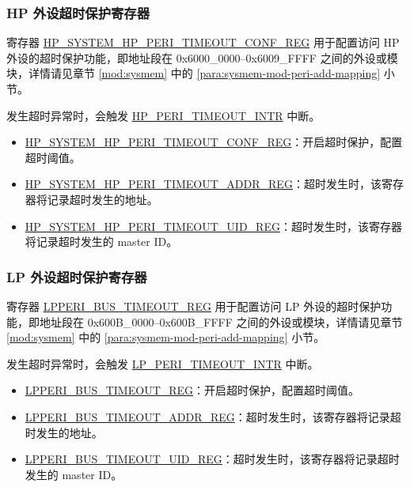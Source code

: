 \documentclass[main\_\_CN.tex]{subfiles}
\begin{document}
\subsubsection{HP 外设超时保护寄存器}

寄存器 \hyperref[regdesc:HPSYSTEMHPPERITIMEOUTCONFREG]{HP\_SYSTEM\_HP\_PERI\_TIMEOUT\_CONF\_REG} 用于配置访问 HP 外设的超时保护功能，即地址段在 0x6000\_0000–0x6009\_FFFF 之间的外设或模块，详情请见章节 \ref{mod:sysmem} \textit{} 中的 \ref{para:sysmem-mod-peri-add-mapping} \textit{} 小节。

发生超时异常时，会触发 \hyperref[tab:peripheral-interrupt-config-status-source]{HP\_PERI\_TIMEOUT\_INTR} 中断。

\begin{itemize}
    \item \hyperref[regdesc:HPSYSTEMHPPERITIMEOUTCONFREG]{HP\_SYSTEM\_HP\_PERI\_TIMEOUT\_CONF\_REG}：开启超时保护，配置超时阈值。
    \item \hyperref[regdesc:HPSYSTEMHPPERITIMEOUTADDRREG]{HP\_SYSTEM\_HP\_PERI\_TIMEOUT\_ADDR\_REG}：超时发生时，该寄存器将记录超时发生的地址。
    \item \hyperref[regdesc:HPSYSTEMHPPERITIMEOUTUIDREG]{HP\_SYSTEM\_HP\_PERI\_TIMEOUT\_UID\_REG}：超时发生时，该寄存器将记录超时发生的 master ID。
\end{itemize}

\subsubsection{LP 外设超时保护寄存器}

寄存器 \hyperref[regdesc:LPPERIBUSTIMEOUTREG]{LPPERI\_BUS\_TIMEOUT\_REG} 用于配置访问 LP 外设的超时保护功能，即地址段在 0x600B\_0000–0x600B\_FFFF 之间的外设或模块，详情请见章节 \ref{mod:sysmem} \textit{} 中的 \ref{para:sysmem-mod-peri-add-mapping} \textit{} 小节。

发生超时异常时，会触发 \hyperref[tab:peripheral-interrupt-config-status-source]{LP\_PERI\_TIMEOUT\_INTR} 中断。

\begin{itemize}
    \item \hyperref[regdesc:LPPERIBUSTIMEOUTREG]{LPPERI\_BUS\_TIMEOUT\_REG}：开启超时保护，配置超时阈值。
    \item \hyperref[regdesc:LPPERIBUSTIMEOUTADDRREG]{LPPERI\_BUS\_TIMEOUT\_ADDR\_REG}：超时发生时，该寄存器将记录超时发生的地址。
    \item \hyperref[regdesc:LPPERIBUSTIMEOUTUIDREG]{LPPERI\_BUS\_TIMEOUT\_UID\_REG}：超时发生时，该寄存器将记录超时发生的 master ID。
\end{itemize}
\end{document}
